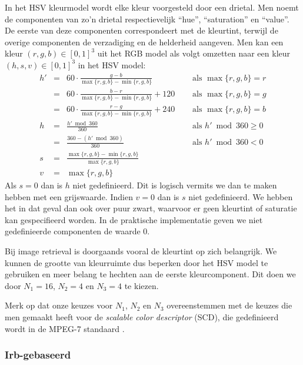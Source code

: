 In het HSV kleurmodel \cite{tkalcic:colour_spaces} wordt elke kleur voorgesteld door een drietal. Men noemt de componenten van 
zo'n drietal respectievelijk ``hue'', ``saturation'' en ``value''. De eerste van deze componenten
correspondeert met de kleurtint, terwijl de overige componenten de verzadiging en de helderheid
aangeven. Men kan een kleur $(r,g,b) \in [0,1]^3$ uit het RGB model als volgt omzetten naar een 
kleur $(h,s,v) \in [0,1]^3$ in het HSV model:
$$
\begin{array}{rcll}
h' & = & 60 \cdot \frac{g - b}{\max \{r,g,b\} - \min \{r,g,b\}}\quad & \textrm{ als } \max \{r,g,b\} = r \\[2pt]
  & = & 60 \cdot \frac{b - r}{\max \{r,g,b\} - \min \{r,g,b\}} + 120\quad & \textrm{ als } \max \{r,g,b\} = g \\[2pt]
  & = & 60 \cdot \frac{r - g}{\max \{r,g,b\} - \min \{r,g,b\}} + 240\quad & \textrm{ als } \max \{r,g,b\} = b \\[6pt]
h & = & \frac{h' \bmod 360}{360} & \textrm{ als } h' \bmod 360 \geq 0 \\[2pt]
  & = & \frac{360 - (h' \bmod 360)}{360} & \textrm{ als } h' \bmod 360 < 0 \\[6pt]
s & = & \frac{\max \{r,g,b\} - \min \{r,g,b\}}{\max \{r,g,b\}} & \\[6pt]
v & = & \max \{r,g,b\}
\end{array}
$$
Als $s=0$ dan is $h$ niet gedefinieerd. Dit is logisch vermits we dan te maken hebben met een 
grijswaarde. Indien $v=0$ dan is $s$ niet gedefinieerd. We hebben het in dat geval dan ook over 
puur zwart, waarvoor er geen kleurtint of saturatie kan gespecifieerd worden. In de praktische
implementatie geven we niet gedefinieerde componenten de waarde $0$.

Bij image retrieval is doorgaands vooral de kleurtint op zich belangrijk. We kunnen de 
grootte van kleurruimte dus
beperken door het HSV model te gebruiken en meer belang te hechten aan de
eerste kleurcomponent. Dit doen we door $N_1=16$, $N_2=4$ en $N_3=4$ te kiezen.

Merk op dat onze keuzes voor $N_1$, $N_2$ en $N_3$ overeenstemmen met de keuzes die men gemaakt
heeft voor de \emph{scalable color descriptor} (SCD), die gedefinieerd wordt in de MPEG-7
standaard \cite{manjunath:color_and_texture_descriptors}.

\subsubsection{Irb-gebaseerd}

